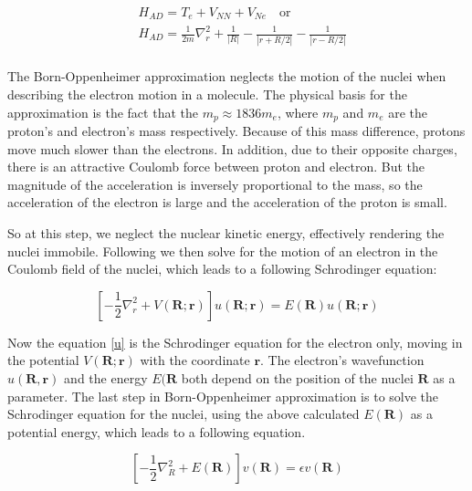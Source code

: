 \begin{equation}\label{HAD2}
\begin{split}
& H_{AD} = T_e + V_{NN} + V_{Ne}\,\,\,\,\text{ or }\\[.8em]
& H_{AD} = \frac{1}{2m}\nabla_r^2 + \frac{1}{\left|R\right|} - \frac{1}{\left|r + R/2\right|} - \frac{1}{\left|r - R/2\right|} \\[.8em]
\end{split}
\end{equation}

The Born-Oppenheimer approximation neglects the motion of the nuclei when describing the electron motion in a molecule. The physical basis for the approximation is the fact that the $ m_p \approx 1836 m_e $, where $ m_p $ and $ m_e $ are the proton's and electron's mass respectively. Because of this mass difference, protons move much slower than the electrons. In addition, due to their opposite charges, there is an attractive Coulomb force between proton and electron. But the magnitude of the acceleration is inversely proportional to the mass, so the acceleration of the electron is large and the acceleration of the  proton is small. 

So at this step, we neglect the nuclear kinetic energy, effectively rendering the nuclei immobile. Following \cite{Slater} we then solve for the motion of an electron in the Coulomb field of the nuclei, which leads to a following Schrodinger equation:

\begin{equation}\label{u}
\left[ -\frac{1}{2}\nabla_r^2 + V(\mathbf{R};\mathbf{r}) \right] u( \mathbf{R}; \mathbf{r} ) = E( \mathbf{R} ) u( \mathbf{R}; \mathbf{r} ) 
\end{equation}

Now the equation \eqref{u} is the Schrodinger equation for the electron only, moving in the potential $ V(\mathbf{R};\mathbf{r})$ with the coordinate $ \mathbf{r} $.  The electron's wavefunction $ u( \mathbf{R},\mathbf{r} ) $ and the energy $ E(\mathbf{R} $ both depend on the position of the nuclei $ \mathbf{R} $ as a parameter. The last step in Born-Oppenheimer approximation is to solve the Schrodinger equation for the nuclei, using the above calculated $ E(\mathbf{R}) $ as a potential energy, which leads to a following equation.

\begin{equation}\label{v}
\left[ -\frac{1}{2}\nabla_R^2 + E(\mathbf{R}) \right] v( \mathbf{R} ) = \epsilon  v( \mathbf{R} )
\end{equation}

